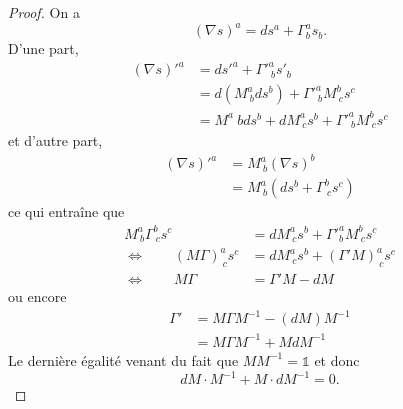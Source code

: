 \documentclass[a4paper,11pt]{report}
\begin{document}
            \begin{proof}
                On a 
                \begin{equation}
                    (\nabla s)^a = ds^a + \Gamma^a_b s_b.
                \end{equation}
                D'une part, 
                \begin{align}
                    (\nabla s)'^a &= ds'^a +  \Gamma'^a_{~b} s'_b \\
                    &= d(M^a_{~b} ds^b) + \Gamma'^a_{~b} M^b_{~c}s^c \\
                    &= M^a{~b}ds^b + dM^a_{~c}s^b + \Gamma'^a_{~b} M^b_{~c}s^c
                \end{align}
                et d'autre part,
                \begin{align}
                    (\nabla s)'^a &= M^a_{~b}(\nabla s)^b \\
                    &=  M^a_{~b}\left( ds^b+\Gamma^b_{~c}s^c \right)
                \end{align}
                ce qui entraîne que
                \begin{align}
                     M^a_{~b}\Gamma^b_{~c}s^c &=  dM^a_{~c}s^b + \Gamma'^a_b M^b_{~c}s^c\\
                     \Leftrightarrow \qquad (M\Gamma)^a_{~c}s^c &= dM^a_{~c}s^b + (\Gamma'M)^a_{~c}s^c\\ 
                     \Leftrightarrow \qquad M\Gamma &= \Gamma'M - dM
                \end{align}
                ou encore
                \begin{align}
                    \Gamma' &= M\Gamma M^{-1}-(dM)M^{-1}\\
                    &= M\Gamma M^{-1} + MdM^{-1}
                \end{align}
                Le dernière égalité venant du fait que $MM^{-1} = \mathbb{1}$ et donc 
                \begin{equation}
                    dM\cdot M^{-1} + M\cdot dM^{-1} = 0.
                \end{equation}
            \end{proof}
        
\end{document}
